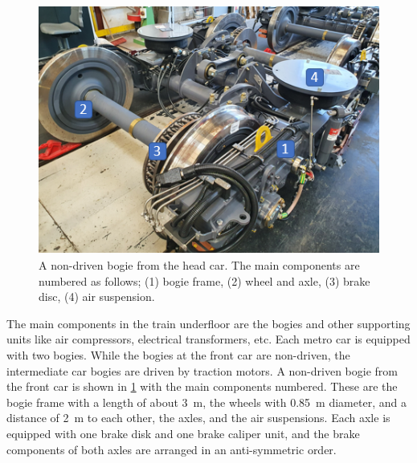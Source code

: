 \begin{figure}[H]
	\centering
	\includegraphics{fig/running_bogie_with_labels.PNG}
	\caption{A non-driven bogie from the head car. The main components are numbered as follows; (1) bogie frame, (2) wheel and axle, (3) brake disc, (4) air suspension.}
	\label{fig:bogie_foto}
\end{figure}

The main components in the train underfloor are the bogies and other supporting units like air compressors, electrical transformers, etc.
Each metro car is equipped with two bogies. While the bogies at the front car are non-driven, the intermediate car bogies are driven by traction motors. A non-driven bogie from the front car is shown in \cref{fig:bogie_foto} with the main components numbered. These are the bogie frame with a length of about \SI{3}{\meter}, the wheels with \SI{0.85}{\meter} diameter, and a distance of \SI{2}{\meter} to each other, the axles, and the air suspensions. Each axle is equipped with one brake disk and one brake caliper unit, and the brake components of both axles are arranged in an anti-symmetric order.

